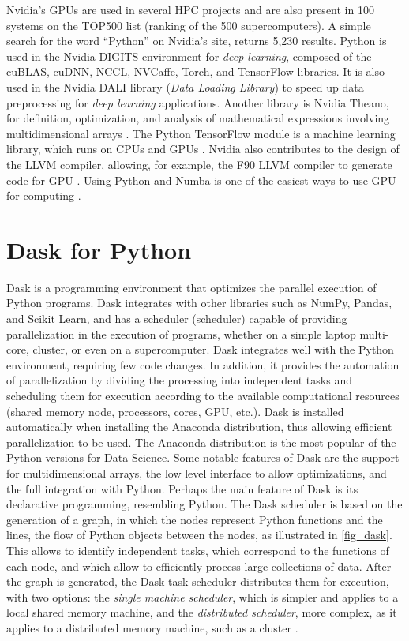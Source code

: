 Nvidia's GPUs are used in several HPC \cite{Holm2020} projects and are also present in 100 systems on the TOP500 list (ranking of the 500 supercomputers). A simple search for the word ``Python'' on Nvidia's site, returns 5,230 results. Python is used in the Nvidia DIGITS environment for \textit{deep learning}, composed of the cuBLAS, cuDNN, NCCL, NVCaffe, Torch, and TensorFlow \cite{Yeager2015} libraries. It is also used in the Nvidia DALI library (\textit{Data Loading Library}) to speed up data preprocessing for \textit{deep learning} \cite{Gayer2019} applications. Another library is Nvidia Theano, for definition, optimization, and analysis of mathematical expressions involving multidimensional arrays \cite{Bergstra2010}. The Python TensorFlow module is a machine learning library, which runs on CPUs and GPUs \cite{Brownlee2016}. Nvidia also contributes to the design of the LLVM compiler, allowing, for example, the F90 LLVM compiler to generate code for GPU \cite{Osmialowski2017}. Using Python and Numba is one of the easiest ways to use GPU for computing \cite{Oden2020}.




\section{Dask for Python}
\label{sec_apprdask}

Dask is a programming environment that optimizes the parallel execution of Python programs. Dask integrates with other libraries such as NumPy, Pandas, and Scikit Learn, and has a scheduler (scheduler) capable of providing parallelization in the execution of programs, whether on a simple laptop multi-core, cluster, or even on a supercomputer. Dask integrates well with the Python environment, requiring few code changes. In addition, it provides the automation of parallelization by dividing the processing into independent tasks and scheduling them for execution according to the available computational resources (shared memory node, processors, cores, GPU, etc.). Dask is installed automatically when installing the Anaconda distribution, thus allowing efficient parallelization to be used. The Anaconda distribution is the most popular of the Python versions for Data Science. Some notable features of Dask are the support for multidimensional arrays, the low level interface to allow optimizations, and the full integration with Python. Perhaps the main feature of Dask is its declarative programming, resembling Python. The Dask scheduler is based on the generation of a graph, in which the nodes represent Python functions and the lines, the flow of Python objects between the nodes, as illustrated in \autoref {fig_dask}. This allows to identify independent tasks, which correspond to the functions of each node, and which allow to efficiently process large collections of data. After the graph is generated, the Dask task scheduler distributes them for execution, with two options: the \textit{single machine scheduler}, which is simpler and applies to a local shared memory machine, and the \textit{distributed scheduler}, more complex, as it applies to a distributed memory machine, such as a cluster
\cite{Rocklin2015,Rocklin2021}.


